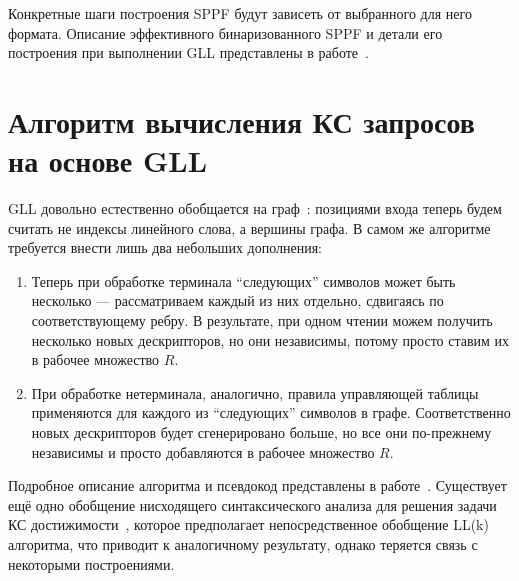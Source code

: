 Конкретные шаги построения SPPF будут зависеть от выбранного для него формата. Описание эффективного бинаризованного SPPF и детали его построения при выполнении GLL представлены в работе~\cite{10.1007/978-3-662-46663-6_5}.

 \section{Алгоритм вычисления КС запросов на основе GLL}

GLL довольно естественно обобщается на граф~\cite{Grigorev:2017:CPQ:3166094.3166104}: позициями входа теперь будем считать не индексы линейного слова, а вершины графа. В самом же алгоритме требуется внести лишь два небольших дополнения:

\begin{enumerate}
  \item Теперь при обработке терминала ``следующих'' символов может быть несколько --- рассматриваем каждый из них отдельно, сдвигаясь по соответствующему ребру. В результате, при одном чтении можем получить несколько новых дескрипторов, но они независимы, потому просто ставим их в рабочее множество $ R $.
  \item При обработке нетерминала, аналогично, правила управляющей таблицы применяются для каждого из ``следующих'' символов в графе. Соответственно новых дескрипторов будет сгенерировано больше, но все они по-прежнему независимы и просто добавляются в рабочее множество $ R $.
\end{enumerate}

Подробное описание алгоритма и псевдокод представлены в работе~\cite{Grigorev:2017:CPQ:3166094.3166104}. Существует ещё одно обобщение нисходящего синтаксического анализа для решения задачи КС достижимости~\cite{MEDEIROS201975}, которое предполагает непосредственное обобщение LL(k) алгоритма, что приводит к аналогичному результату, однако теряется связь с некоторыми построениями.

